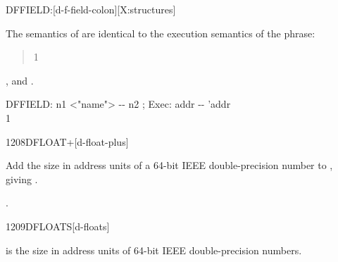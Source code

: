 
\begin{worddef}{}{DFFIELD:}[d-f-field-colon][X:structures]
\item \stack{}{}

	The semantics of  are identical to the
	execution semantics of the phrase:
	\begin{quote}\ttfamily
		 1  
	\end{quote}

\see {},
	 and
	.

	\begin{implement} %

		\word{:} DFFIELD:\tab{} n1 <"name"> -{}- n2 ; Exec: addr -{}- 'addr \\
		\tab {} 1   \\
		\word{;}
	\end{implement}

\end{worddef}


\begin{worddef}{1208}{DFLOAT+}[d-float-plus]
\item {}

	Add the size in address units of a 64-bit IEEE double-precision
	number to , giving .

\see {}.
\end{worddef}


\begin{worddef}{1209}{DFLOATS}[d-floats]
\item {}

	 is the size in address units of  64-bit
	IEEE double-precision numbers.
\end{worddef}


%


